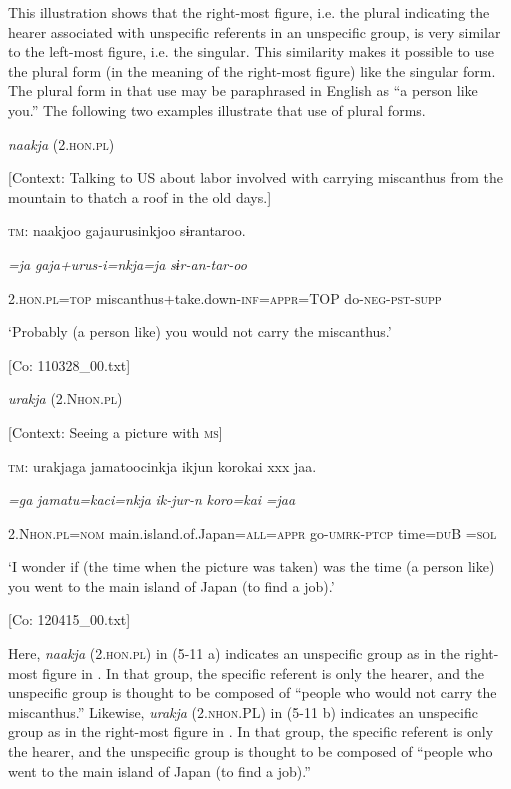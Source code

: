 This illustration shows that the right-most figure, i.e. the plural indicating the hearer associated with unspecific referents in an unspecific group, is very similar to the left-most figure, i.e. the singular. This similarity makes it possible to use the plural form (in the meaning of the right-most figure) like the singular form. The plural form in that use may be paraphrased in English as “a person like you.” The following two examples illustrate that use of plural forms.

\ea \label{ex:5:11}  \ea \label{ex:5:11a} \textit{naakja} (2.\textsc{hon}.\textsc{pl})

    [Context: Talking to US about labor involved with carrying miscanthus from the mountain to thatch a roof in the old days.]

    \textsc{tm}:  naakjoo  gajaurusinkjoo  sɨrantaroo.

      \textit{=ja}  \textit{gaja+urus-i=nkja=ja} \textit{sɨr-an-tar-oo}
                                                       
      2.\textsc{hon}.\textsc{pl}=\textsc{top}  miscanthus+take.down-\textsc{inf}=\textsc{appr}=TOP  do-\textsc{neg}-\textsc{pst}-\textsc{supp}

      ‘Probably (a person like) you would not carry the miscanthus.’

      [Co: 110328\_00.txt]

 \ex \label{ex:5:b} \textit{urakja} (2.N\textsc{hon}.\textsc{pl})

    [Context: Seeing a picture with \textsc{ms}]

    \textsc{tm}:  urakjaga  jamatoocinkja  ikjun  {\textbar}koro{\textbar}kai  xxx  jaa.

      \textit{=ga}  \textit{jamatu=kaci=nkja} \textit{ik-jur-n}  \textit{koro=kai}    \textit{=jaa}
                                                   
      2.N\textsc{hon}.\textsc{pl}=\textsc{nom}  main.island.of.Japan=\textsc{all}=\textsc{appr}  go-\textsc{umrk}-\textsc{ptcp}  time=\textsc{du}B    =\textsc{sol}

      ‘I wonder if (the time when the picture was taken) was the time (a person like) you went to the main island of Japan (to find a job).’

      [Co: 120415\_00.txt]
      \z
      \z

Here, \textit{naakja} (2.\textsc{hon}.\textsc{pl}) in (5-11 a) indicates an unspecific group as in the right-most figure in . In that group, the specific referent is only the hearer, and the unspecific group is thought to be composed of “people who would not carry the miscanthus.” Likewise, \textit{urakja} (2.\textsc{nhon}.PL) in (5-11 b) indicates an unspecific group as in the right-most figure in . In that group, the specific referent is only the hearer, and the unspecific group is thought to be composed of “people who went to the main island of Japan (to find a job).”

